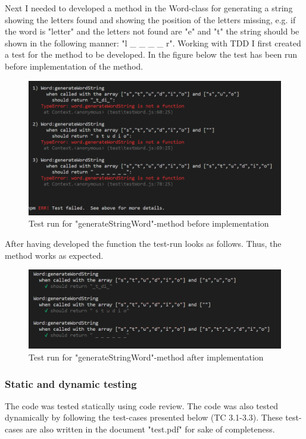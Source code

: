 \documentclass[12pt, letterpaper]{article}
\begin{document}
Next I needed to developed a method in the Word-class for generating a string showing the letters found and showing the position of the letters missing, e.g. if the word is "letter" and the letters not found are "e" and "t" the string should be shown in the following manner: "l \_ \_ \_ \_ r". Working with TDD I first created a test for the method to be developed. In the figure below the test has been run before implementation of the method.
\begin{figure}[H]\label{fig3}
	\centering
	\includegraphics[scale=0.75]{wordtest1.png}
	\caption{Test run for "generateStringWord"-method before implementation}
\end{figure}
After having developed the function the test-run looks as follows. Thus, the method works as expected.
\begin{figure}[H]\label{fig4}
	\centering
	\includegraphics[scale=0.75]{wordtest2.png}
	\caption{Test run for "generateStringWord"-method after implementation}
\end{figure}
\subsubsection{Static and dynamic testing}
The code was tested statically using code review. The code was also tested dynamically by following the test-cases presented below (TC 3.1-3.3). These test-cases are also written in the document "test.pdf" for sake of completeness.
\end{document}
